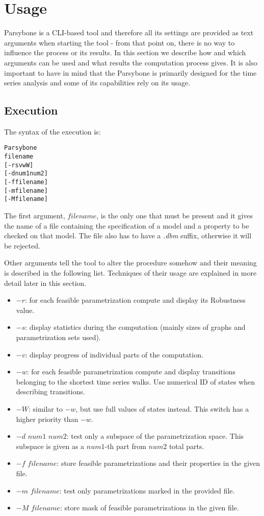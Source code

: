 \documentclass[12pt]{article}
\begin{document}
\section{Usage}
Parsybone is a CLI-based tool and therefore all its settings are provided as text arguments when starting the tool - from that point on, there is no way to influence the process or its results. In this section we describe how and which arguments can be used and what results the computation process gives. It is also important to have in mind that the Parsybone is primarily designed for the time series analysis and some of its capabilities rely on its usage.

\subsection{Execution}
The syntax of the execution is:
\begin{alltt}
Parsybone 
    filename
    [-rsvwW]
    [-d num1 num2]
    [-f filename]
    [-m filename]
    [-M filename]
\end{alltt}
The first argument, $filename$, is the only one that must be present and it gives the name of a file containing the specification of a model and a property to be checked on that model. The file also has to have a \emph{.dbm} suffix, otherwise it will be rejected.

Other arguments tell the tool to alter the procedure somehow and their meaning is described in the following list. Techniques of their usage are explained in more detail later in this section.
\begin{itemize}
\item $-r$: for each feasible parametrization compute and display its \textrm{Robustness} value.
\item $-s$: display statistics during the computation (mainly sizes of graphs and parametrization sets used).
\item $-v$: display progress of individual parts of the computation.
\item $-w$: for each feasible parametrization compute and display transitions belonging to the shortest time series walks. Use numerical ID of states when describing transitions.
\item $-W$: similar to $-w$, but use full values of states instead. This switch has a higher priority than $-w$.
\item $-d$ $num1$ $num2$: test only a subspace of the parametrization space. This subspace is given as a $num1$-th part from $num2$ total parts.
\item $-f$ $filename$: store feasible parametrizations and their properties in the given file.
\item $-m$ $filename$: test only parametrizations marked in the provided file.
\item $-M$ $filename$: store mask of feasible parametrizations in the given file.
\end{itemize}
\end{document}
